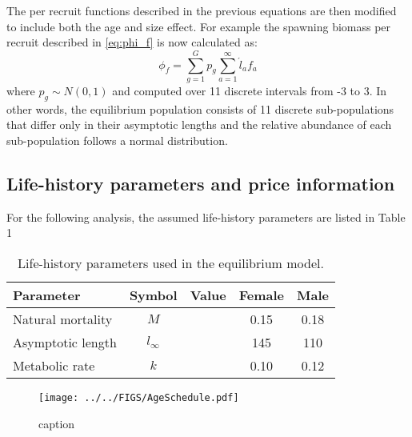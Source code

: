 The per recruit functions described in the previous equations are then modified to include both the age and size effect.  For example the spawning biomass per recruit described in \eqref{eq:phi_f} is now calculated as:
\begin{equation}
	\phi_{f} =\sum_{g=1}^G p_g \sum_{a=1}^\infty \acute{l}_a f_a\label{eq:phi_fg}
\end{equation}
where $p_g \sim N(0,1)$ and computed over 11 discrete intervals from -3 to 3.  In other words, the equilibrium population consists of 11 discrete sub-populations that differ only in their asymptotic lengths and the relative abundance of each sub-population follows a normal distribution.

\subsection*{Life-history parameters and price information} %
\label{sub:life_history_parameters_and_price_information}
For the following analysis, the assumed life-history parameters are listed in Table 1

\begin{table}
	\caption{Life-history parameters used in the equilibrium model.}
	\label{table:Life_history_pars}
	\begin{center}
	\begin{tabular}{lcccc}
		\hline
		Parameter         & Symbol     & Value & Female & Male \\
		\hline
		Natural mortality & $M$        &       &   0.15 & 0.18 \\
		Asymptotic length & $l_\infty$ &       &   145  & 110  \\
		Metabolic rate    & $k$        &       &   0.10 & 0.12 \\
		\hline
		
	\end{tabular}
	\end{center}
\end{table}


\begin{figure}[htbp]
	\centering
		\texttt{[image: ../../FIGS/AgeSchedule.pdf]}
	\caption{caption}
	\label{fig:FIGS_AgeSchedule}
\end{figure}



